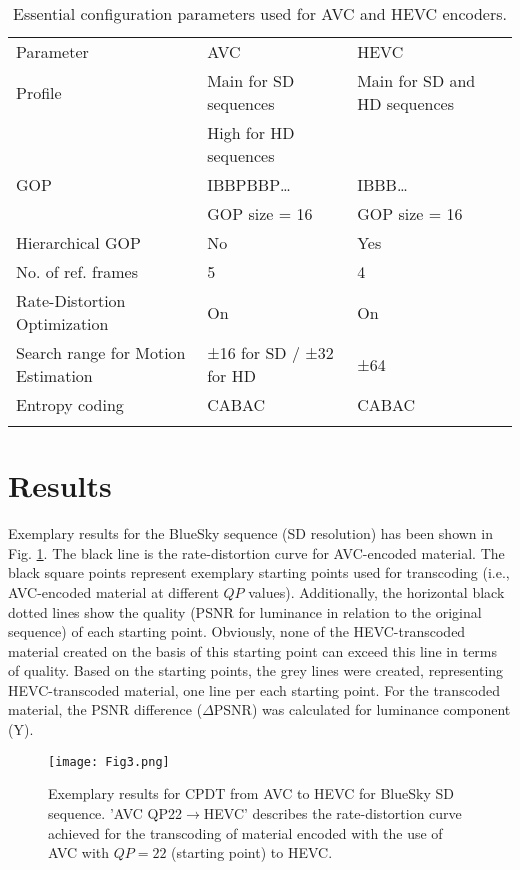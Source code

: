 \documentclass[twocolumn]{svjour3}          %
\begin{document}
\begin{table*}
\caption{Essential configuration parameters used for AVC and HEVC encoders.}
\label{tab:1}       %
\begin{tabular}{lll}
\hline\noalign{\smallskip}
Parameter & AVC & HEVC\\
\noalign{\smallskip}\hline\noalign{\smallskip}
Profile & Main for SD sequences & Main for SD and HD sequences\\
 &  High for HD sequences & \\
GOP & IBBPBBP… & IBBB…\\
 & GOP size = 16 & GOP size = 16\\
Hierarchical GOP & No & Yes\\
No. of ref. frames & 5 & 4\\
Rate-Distortion Optimization & On & On\\
Search range for Motion Estimation & ±16 for SD / 
±32 for HD & ±64\\
Entropy coding & CABAC & CABAC\\
\noalign{\smallskip}\hline
\end{tabular}
\end{table*}

\section{Results}
\label{sec:3}
Exemplary results for the BlueSky sequence (SD resolution) has been shown in Fig. \ref{fig:3}. The black line is the rate-distortion curve for AVC-encoded material. The black square points represent exemplary starting points used for transcoding (i.e., AVC-encoded material at different $QP$ values). Additionally, the horizontal black dotted lines show the quality (PSNR for luminance in relation to the original sequence) of each starting point. Obviously, none of the HEVC-transcoded material created on the basis of this starting point can exceed this line in terms of quality. Based on the starting points, the grey lines were created, representing HEVC-transcoded material, one line per each starting point. For the transcoded material, the PSNR difference ($\Delta$PSNR) was calculated for luminance component (Y).

\begin{figure}
\texttt{[image: Fig3.png]}
\caption{Exemplary results for CPDT from AVC to HEVC for BlueSky SD sequence. 'AVC QP22$\rightarrow$HEVC' describes the rate-distortion curve achieved for the transcoding of material encoded with the use of AVC with $QP=22$ (starting point) to HEVC.}
\label{fig:3}       %
\end{figure}
\end{document}
